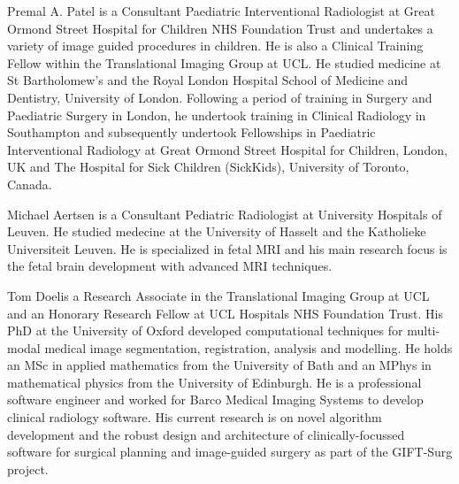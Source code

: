\documentclass[10pt,journal,compsoc]{IEEEtran}
\begin{document}
\begin{IEEEbiography}{Premal A. Patel} is a Consultant Paediatric Interventional Radiologist at Great Ormond Street Hospital for Children NHS Foundation Trust and undertakes a variety of image guided procedures in children.  He is also a Clinical Training Fellow within the Translational Imaging Group at UCL. He studied medicine at St Bartholomew’s and the Royal London Hospital School of Medicine and Dentistry, University of London. Following a period of training in Surgery and Paediatric Surgery in London, he undertook training in Clinical Radiology in Southampton and subsequently undertook Fellowships in Paediatric Interventional Radiology at Great Ormond Street Hospital for Children, London, UK and The Hospital for Sick Children (SickKids), University of Toronto, Canada. 
\end{IEEEbiography}

\begin{IEEEbiography}{Michael Aertsen} is a Consultant Pediatric Radiologist at University Hospitals of Leuven. He studied medecine at the University of Hasselt and the Katholieke Universiteit Leuven. He is specialized in fetal MRI and his main research focus is the fetal brain development with advanced MRI techniques.
\end{IEEEbiography}

\begin{IEEEbiography}{Tom Doel}is a Research Associate in the Translational Imaging Group at UCL and an Honorary Research Fellow at UCL Hospitals NHS Foundation Trust. His PhD at the University of Oxford developed computational techniques for multi-modal medical image segmentation, registration, analysis and modelling. He holds an MSc in applied mathematics from the University of Bath and an MPhys in mathematical physics from the University of Edinburgh. He is a professional software engineer and worked for Barco Medical Imaging Systems to develop clinical radiology software. His current research is on novel algorithm development and the robust design and architecture of clinically-focussed software for surgical planning and image-guided surgery as part of the GIFT-Surg project.
\end{IEEEbiography}
\end{document}
